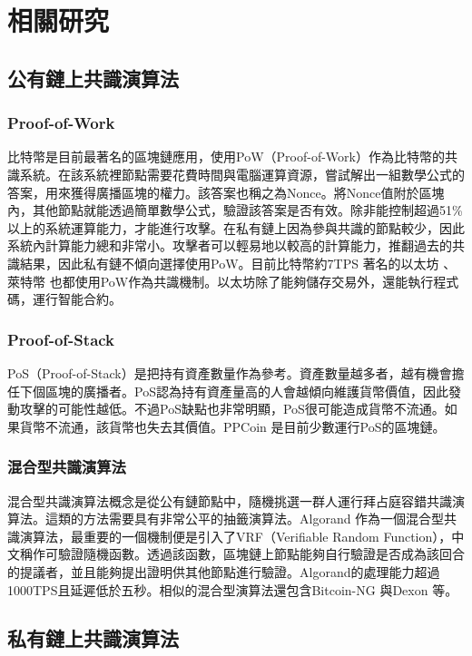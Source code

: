 \chapter{相關研究}\label{se_7}
\section{公有鏈上共識演算法}\label{se_7}
\subsection{Proof-of-Work}\label{se_7} 
比特幣是目前最著名的區塊鏈應用，使用PoW（Proof-of-Work）作為比特幣的共識系統。在該系統裡節點需要花費時間與電腦運算資源，嘗試解出一組數學公式的答案，用來獲得廣播區塊的權力。該答案也稱之為Nonce。將Nonce值附於區塊內，其他節點就能透過簡單數學公式，驗證該答案是否有效。除非能控制超過51\%以上的系統運算能力，才能進行攻擊。在私有鏈上因為參與共識的節點較少，因此系統內計算能力總和非常小。攻擊者可以輕易地以較高的計算能力，推翻過去的共識結果，因此私有鏈不傾向選擇使用PoW。目前比特幣約7TPS \cite{BitcoinThroughput}
著名的以太坊 \cite{Ethereum}、萊特幣 \cite{Litecoin} 也都使用PoW作為共識機制。以太坊除了能夠儲存交易外，還能執行程式碼，運行智能合約。
\subsection{Proof-of-Stack}\label{se_7}
PoS（Proof-of-Stack）是把持有資產數量作為參考。資產數量越多者，越有機會擔任下個區塊的廣播者。PoS認為持有資產量高的人會越傾向維護貨幣價值，因此發動攻擊的可能性越低。不過PoS缺點也非常明顯，PoS很可能造成貨幣不流通。如果貨幣不流通，該貨幣也失去其價值。PPCoin \cite{vasin2014blackcoin}是目前少數運行PoS的區塊鏈。
\subsection{混合型共識演算法}\label{se_7}
混合型共識演算法概念是從公有鏈節點中，隨機挑選一群人運行拜占庭容錯共識演算法。這類的方法需要具有非常公平的抽籤演算法。Algorand \cite{gilad2017algorand}作為一個混合型共識演算法，最重要的一個機制便是引入了VRF（Verifiable Random Function），中文稱作可驗證隨機函數。透過該函數，區塊鏈上節點能夠自行驗證是否成為該回合的提議者，並且能夠提出證明供其他節點進行驗證。Algorand的處理能力超過1000TPS且延遲低於五秒。相似的混合型演算法還包含Bitcoin-NG \cite{eyal2016bitcoin}與Dexon \cite{dexon}等。


\section{私有鏈上共識演算法}\label{se_7}
